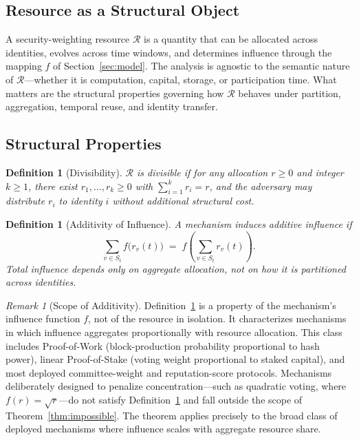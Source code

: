 \documentclass[10pt,journal,compsoc]{IEEEtran}
\newtheorem{definition}[theorem]{Definition}
\theoremstyle{remark}
\newtheorem{remark}{Remark}[section]
\begin{document}
	\subsection{Resource as a Structural Object}
	\label{ssec:resource_object}
	
	A security-weighting resource $\mathcal{R}$ is a quantity
	that can be allocated across identities, evolves across
	time windows, and determines influence through the
	mapping $f$ of Section~\ref{sec:model}.
	The analysis is agnostic to the semantic nature of
	$\mathcal{R}$---whether it is computation, capital,
	storage, or participation time.
	What matters are the structural properties governing
	how $\mathcal{R}$ behaves under partition, aggregation,
	temporal reuse, and identity transfer.
	
	\subsection{Structural Properties}
	\label{ssec:properties}
	
	\begin{definition}[Divisibility]
		\label{def:divisibility}
		$\mathcal{R}$ is \emph{divisible} if for any allocation
		$r \geq 0$ and integer $k \geq 1$, there exist
		$r_1, \ldots, r_k \geq 0$ with $\sum_{i=1}^{k} r_i = r$,
		and the adversary may distribute $r_i$ to identity $i$
		without additional structural cost.
	\end{definition}
	
	\begin{definition}[Additivity of Influence]
		\label{def:additivity}
		A mechanism \emph{induces additive influence} if
		\begin{equation}
			\sum_{v \in S_t} f\bigl(r_v(t)\bigr)
			\;=\;
			f\!\left(\sum_{v \in S_t} r_v(t)\right).
		\end{equation}
		Total influence depends only on aggregate allocation,
		not on how it is partitioned across identities.
	\end{definition}
	
	\begin{remark}[Scope of Additivity]
		\label{rem:additivity_scope}
		Definition~\ref{def:additivity} is a property of
		the mechanism's influence function $f$, not of
		the resource in isolation.
		It characterizes mechanisms in which influence
		aggregates proportionally with resource allocation.
		This class includes Proof-of-Work (block-production
		probability proportional to hash power),
		linear Proof-of-Stake (voting weight proportional
		to staked capital), and most deployed committee-weight
		and reputation-score protocols.
		Mechanisms deliberately designed to penalize
		concentration---such as quadratic voting, where
		$f(r) = \sqrt{r}$---do not satisfy
		Definition~\ref{def:additivity} and fall outside
		the scope of Theorem~\ref{thm:impossible}.
		The theorem applies precisely to the broad class of
		deployed mechanisms where influence scales with
		aggregate resource share.
	\end{remark}
	
\end{document}
